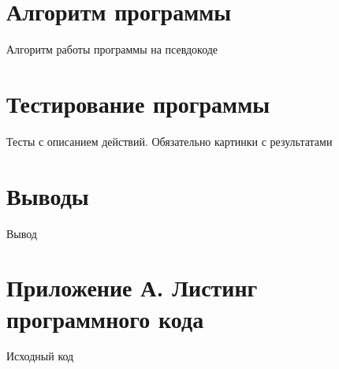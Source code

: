 \documentclass[12pt,a4paper]{article}  %
\begin{document}
	
	\section*{Алгоритм программы}
	
	Алгоритм работы программы на псевдокоде
	
	
	\section*{Тестирование программы}
	
	Тесты с описанием действий. Обязательно картинки с результатами
	
	\section*{Выводы}
	
	Вывод
	
	\newpage
	\section*{Приложение А. Листинг программного кода}
	
	Исходный код
\end{document}

